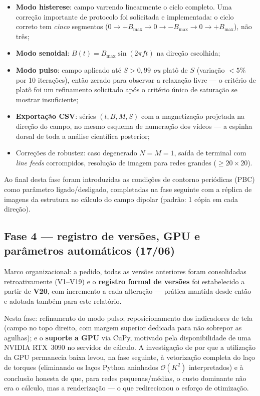 \documentclass[11pt,a4paper]{article}
\begin{document}
\begin{itemize}
\item \textbf{Modo histerese}: campo varrendo linearmente o ciclo
completo. Uma correção importante de protocolo foi solicitada e
implementada: o ciclo correto tem \emph{cinco} segmentos ($0 \to +B_{\max}
\to 0 \to -B_{\max} \to 0 \to +B_{\max}$), não três;
\item \textbf{Modo senoidal}: $B(t) = B_{\max}\sin(2\pi f t)$ na direção
escolhida;
\item \textbf{Modo pulso}: campo aplicado até $S > 0{,}99$ \emph{ou}
platô de $S$ (variação $<5\%$ por 10 iterações), então zerado para
observar a relaxação livre --- o critério de platô foi um refinamento
solicitado após o critério único de saturação se mostrar insuficiente;
\item \textbf{Exportação CSV}: séries $(t, B, M, S)$ com a magnetização
projetada na direção do campo, no mesmo esquema de numeração dos vídeos
--- a espinha dorsal de toda a análise científica posterior;
\item Correções de robustez: caso degenerado $N = M = 1$, saída de
terminal com \emph{line feeds} corrompidos, resolução de imagem para
redes grandes ($\geq 20 \times 20$).
\end{itemize}

Ao final desta fase foram introduzidas as condições de contorno
periódicas (PBC) como parâmetro ligado/desligado, completadas na fase
seguinte com a réplica de imagens da estrutura no cálculo do campo
dipolar (padrão: 1 cópia em cada direção).

\subsection{Fase 4 --- registro de versões, GPU e parâmetros
automáticos (17/06)}

Marco organizacional: a pedido, todas as versões anteriores foram
consolidadas retroativamente (V1--V19) e o \textbf{registro formal de
versões} foi estabelecido a partir de \textbf{V20}, com incremento a
cada alteração --- prática mantida desde então e adotada também para
este relatório.

Nesta fase: refinamento do modo pulso; reposicionamento dos indicadores
de tela (campo no topo direito, com margem superior dedicada para não
sobrepor as agulhas); e o \textbf{suporte a GPU} via CuPy, motivado pela
disponibilidade de uma NVIDIA RTX~3090 no servidor de cálculo. A
investigação de por que a utilização da GPU permanecia baixa levou, na
fase seguinte, à vetorização completa do laço de torques (eliminando os
laços Python aninhados $\mathcal{O}(K^2)$ interpretados) e à conclusão
honesta de que, para redes pequenas/médias, o custo dominante não era o
cálculo, mas a renderização --- o que redirecionou o esforço de
otimização.
\end{document}
